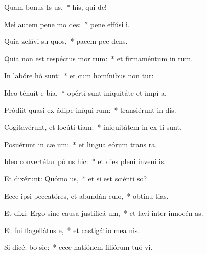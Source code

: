 \item Quam bonus Is us,~* his, qui   de!
\item Mei autem pene mo  des:~* pene effúsi   i.
\item Quia zelávi su quos,~* pacem pec dens.
\item Quia non est respéctus mor rum:~* et firmaméntum in  rum.
\item In labóre hó  sunt:~* et cum homínibus non tur:
\item Ideo ténuit e bia,~* opérti sunt iniquitáte et impi a.
\item Pródiit quasi ex ádipe iníqui rum:~* transiérunt in  dis.
\item Cogitavérunt, et locúti  tiam:~* iniquitátem in ex ti sunt.
\item Posuérunt in cæ  um:~* et lingua eórum trans  ra.
\item Ideo convertétur pó us hic:~* et dies pleni inveni  is.
\item Et dixérunt: Quómo  us,~* et si est sciénti  so?
\item Ecce ipsi peccatóres, et abundán  culo,~* obtinu tias.
\item Et dixi: Ergo sine causa justificá  um,~* et lavi inter innocén  as.
\item Et fui flagellátus  e,~* et castigátio mea  nis.
\item Si dicé: bo sic:~* ecce natiónem filiórum tuó vi.
